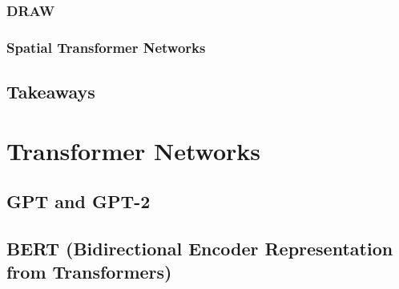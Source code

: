 			\subsubsection{DRAW} %

			\subsubsection{Spatial Transformer Networks} %

		\subsection{Takeaways} %

	\section{Transformer Networks} %

		\subsection{GPT and GPT-2} %

		\subsection{BERT (Bidirectional Encoder Representation from Transformers)} %
